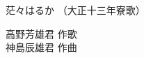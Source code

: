 \documentclass[10pt,b5j]{tarticle} %
\begin{document}
\begin{minipage}[c]{0.7\hsize} %
    \begin{center}
        {\LARGE
            茫々はるか %
        }
        {\small 
            （大正十三年寮歌） %
        }
    \end{center}
\end{minipage}
\begin{minipage}[c]{0.3\hsize} %
    \begin{flushright} %
        高野芳雄君 作歌\\神島辰雄君 作曲 %
    \end{flushright}
\end{minipage}
\end{document}
